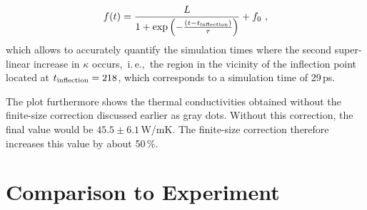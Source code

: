 \begin{align}
	f(t) 
		= \frac{L}{1 + \exp \left(-\frac{(t-t_{\rm inflection})}{\tau} \right)} + f_0~,
	\label{eq:imp.f_logistic}
\end{align}
which allows to accurately quantify the simulation times where the second super-linear increase in $\kappa$ occurs,~i.\,e.,~the region in the vicinity of the inflection point located at $t_{\rm inflection} = 218$, which corresponds to a simulation time of 29\,ps.

The plot furthermore shows the thermal conductivities obtained without the finite-size correction discussed earlier as gray dots. Without this correction, the final value would be $45.5 \pm 6.1$\,W/mK. The finite-size correction therefore increases this value by about 50\,\%.

\section{Comparison to Experiment}

